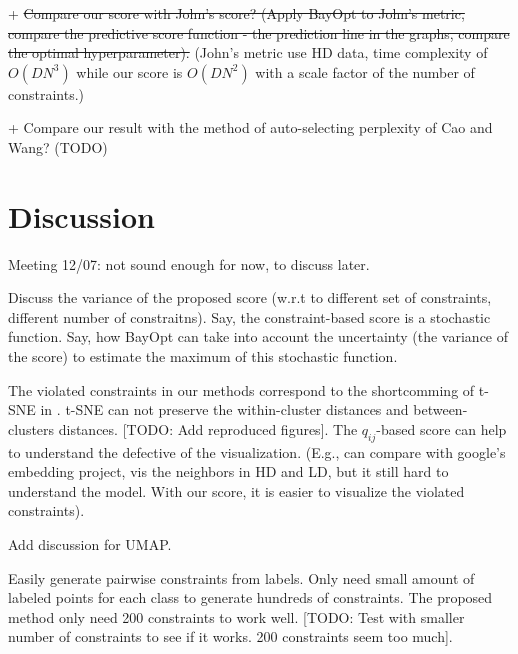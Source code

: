 + \st{Compare our score with John's score? (Apply BayOpt to John's metric, compare the predictive score function - the prediction line in the graphs, compare the optimal hyperparameter).}
(John's metric use HD data, time complexity of $O(DN^3)$ while our score is $O(DN^2)$ with a scale factor of the number of constraints.)

+ Compare our result with the method of auto-selecting perplexity of Cao and Wang? (TODO)

\begin{figure*}
\centering
\texttt{[image: \{DIGITS\_tsne\_metamap]}.png}
\caption{Metamap for tSNE embeddings of DIGITS dataset.}
\end{figure*}

\begin{figure*}
\centering
\texttt{[image: \{DIGITS\_umap\_metamap]}.png}
\caption{Metamap for UMAP embeddings of DIGITS dataset.}
\end{figure*}



\section{Discussion}
Meeting 12/07: not sound enough for now, to discuss later.

\par
Discuss the variance of the proposed score (w.r.t to different set of constraints, different number of constraitns).
Say, the constraint-based score is a stochastic function.
Say, how BayOpt can take into account the uncertainty (the variance of the score) to estimate the maximum of this stochastic function.


\par
The violated constraints in our methods correspond to the shortcomming of t-SNE in \cite{wattenberg2016use}.
t-SNE can not preserve the within-cluster distances and between-clusters distances.
[TODO: Add reproduced figures].
The $q_{ij}$-based score can help to understand the defective of the visualization.
(E.g., can compare with google's embedding project, vis the neighbors in HD and LD, but it still hard to understand the model.
With our score, it is easier to visualize the violated constraints).

\par
Add discussion for UMAP.

\par
Easily generate pairwise constraints from labels.
  Only need small amount of labeled points for each class to generate hundreds of constraints.
  The proposed method only need 200 constraints to work well.
  [TODO: Test with smaller number of constraints to see if it works. 200 constraints seem too much].

